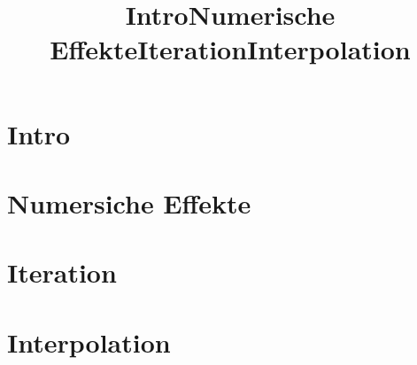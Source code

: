 %
%
%
\title[Intro]{Intro}
\section{Intro}
\begin{frame}
\titlepage
\end{frame}
\subtitle{}


\title[Effekte]{Numerische Effekte}
\section{Numersiche Effekte}
\begin{frame}
\titlepage
\end{frame}
\subtitle{}


\title[Iteration]{Iteration}
\section{Iteration}
\begin{frame}
\titlepage
\end{frame}
\subtitle{}


\title[Interpolation]{Interpolation}
\section{Interpolation}
\begin{frame}
\titlepage
\end{frame}
\subtitle{}


